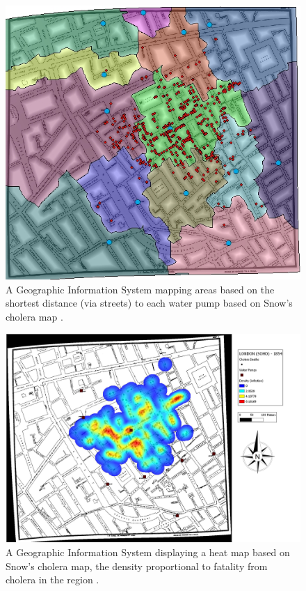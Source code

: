 \documentclass[12pt]{article}
\begin{document}
\begin{figure}
\centering
\includegraphics[scale=1.0]{images/gis_2}
\caption{
A Geographic Information System mapping areas based on the shortest distance (via streets) to each water pump based on Snow's cholera map \cite{udel2}.
}
\label{fig:gis2}
\end{figure}

\begin{figure}
\centering
\hspace*{-3cm}
\includegraphics[scale=0.3]{images/gis_heatmap}
\caption{ 
A Geographic Information System displaying a heat map based on Snow's cholera map, the density proportional to fatality from cholera in the region \cite{heatmap}.}
\label{fig:heatmap}
\end{figure}
\end{document}
